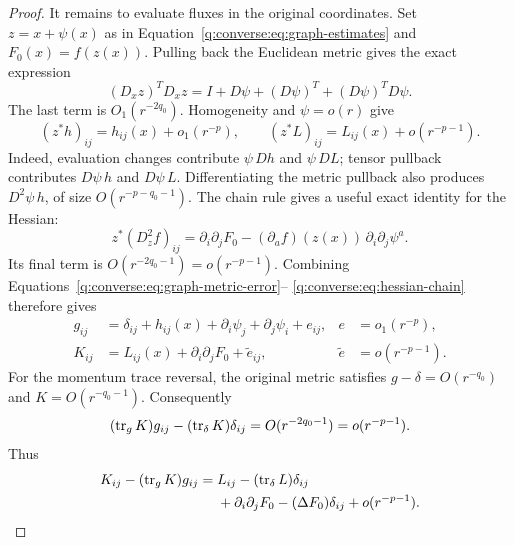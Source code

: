 \begin{proof}
It remains to evaluate fluxes in the original coordinates.  Set
$z=x+\psi(x)$ as in Equation~\eqref{q:converse:eq:graph-estimates} and
$F_0(x)=f(z(x))$.  Pulling back the Euclidean metric gives the exact
expression
\[
 (D_xz)^TD_xz
 =I+D\psi+(D\psi)^T+(D\psi)^TD\psi.
\]
The last term is $O_1(r^{-2q_0})$.  Homogeneity and $\psi=o(r)$ give
\[
 (z^*h)_{ij}=h_{ij}(x)+o_1(r^{-p}),
 \qquad
 (z^*L)_{ij}=L_{ij}(x)+o(r^{-p-1}).
\]
Indeed, evaluation changes contribute $\psi\,Dh$ and $\psi\,DL$;
tensor pullback contributes $D\psi\,h$ and $D\psi\,L$.
Differentiating the metric pullback also produces
$D^2\psi\,h$, of size $O(r^{-p-q_0-1})$.
The chain rule gives a useful exact identity for the Hessian:
\begin{equation}
 z^*(D_z^2f)_{ij}
 =\partial_i\partial_jF_0
   -(\partial_af)(z(x))\,\partial_i\partial_j\psi^a.
 \label{q:converse:eq:hessian-chain}
\end{equation}
Its final term is $O(r^{-2q_0-1})=o(r^{-p-1})$.
Combining Equations~\eqref{q:converse:eq:graph-metric-error}--
\eqref{q:converse:eq:hessian-chain} therefore gives
\begin{align}
 g_{ij}
 &=\delta_{ij}+h_{ij}(x)
       +\partial_i\psi_j+\partial_j\psi_i+e_{ij},
 &e&=o_1(r^{-p}),
 \label{q:converse:eq:original-metric}\\
 K_{ij}
 &=L_{ij}(x)+\partial_i\partial_jF_0+\widetilde e_{ij},
 &\widetilde e&=o(r^{-p-1}).
 \label{q:converse:eq:original-second}
\end{align}
For the momentum trace reversal, the original metric satisfies
$g-\delta=O(r^{-q_0})$ and $K=O(r^{-q_0-1})$.  Consequently
\[
 (\operatorname{tr}_gK)g_{ij}-(\operatorname{tr}_\delta K)\delta_{ij}
 =O(r^{-2q_0-1})=o(r^{-p-1}).
\]
Thus
\begin{equation}
 \begin{split}
 K_{ij}-(\operatorname{tr}_gK)g_{ij}
 ={}&L_{ij}-(\operatorname{tr}_\delta L)\delta_{ij}\\
 &+\partial_i\partial_jF_0-(\Delta F_0)\delta_{ij}
       +o(r^{-p-1}).
 \end{split}
 \label{q:converse:eq:momentum-decomposition}
\end{equation}


\end{proof}
